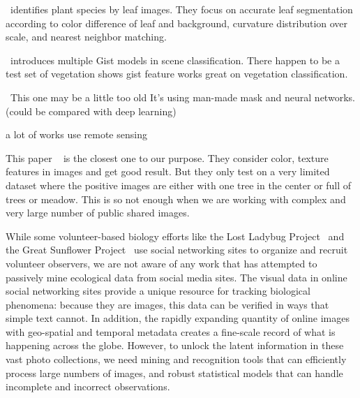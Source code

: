 \documentclass[10pt,journal,compsoc]{IEEEtran}
\begin{document}

~\cite{kumar2012leafsnap}identifies plant species by leaf images. They focus on accurate leaf segmentation according to color difference of leaf and background, curvature distribution over scale, and nearest neighbor matching.


~\cite{siagian2008comparison}introduces multiple Gist models in scene classification. There happen to be a test set of vegetation shows gist feature works great on vegetation classification.


~\cite{foschi1997detecting}This one may be a little too old
It's using man-made mask and neural networks.
(could be compared with deep learning)

a lot of works use remote sensing 

This paper ~\cite{balamurugan2007greenery}
is the closest one to our purpose.
They consider
color, texture features in images and get good result. But they only test on a very limited dataset where the positive images are either with one tree in the center or full of trees or meadow. This is so not enough when we are working with  complex and very large number of public shared images.


While some volunteer-based biology efforts like the Lost Ladybug
Project~\cite{lostladybug} and the Great Sunflower
Project~\cite{greatsunflower} use social networking sites to
organize and recruit volunteer observers, we are not aware of any
work that has attempted to passively mine ecological data from social media
sites. The visual data in online social networking sites provide a
unique resource for tracking biological phenomena:  because they are
images, this data can be verified in ways that simple text 
cannot.  In addition, the rapidly expanding quantity
of online images with geo-spatial and temporal metadata creates a
fine-scale record of what is happening across the globe.  However, to
unlock the latent information in these vast photo collections, we need
 mining and recognition tools that can efficiently
process large numbers of images, and robust statistical models that
can handle incomplete and incorrect observations.
\end{document}
